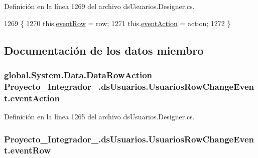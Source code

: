 Definición en la línea 1269 del archivo ds\-Usuarios.\-Designer.\-cs.


\begin{DoxyCode}
1269                                                                                                    \{
1270                 this.\hyperlink{class_proyecto___integrador__3_1_1ds_usuarios_1_1_usuarios_row_change_event_af50597f4b5fdc0ce6b23b6873296b94c}{eventRow} = row;
1271                 this.\hyperlink{class_proyecto___integrador__3_1_1ds_usuarios_1_1_usuarios_row_change_event_a426439315e86d5296a63052620758e78}{eventAction} = action;
1272             \}
\end{DoxyCode}


\subsection{Documentación de los datos miembro}
\hypertarget{class_proyecto___integrador__3_1_1ds_usuarios_1_1_usuarios_row_change_event_a426439315e86d5296a63052620758e78}{
\subsubsection[{event\-Action}]{\setlength{\rightskip}{0pt plus 5cm}global.\-System.\-Data.\-Data\-Row\-Action Proyecto\-\_\-\-Integrador\-\_.\-ds\-Usuarios.\-Usuarios\-Row\-Change\-Event.\-event\-Action\hspace{0.3cm}{\ttfamily [private]}}}\label{class_proyecto___integrador__3_1_1ds_usuarios_1_1_usuarios_row_change_event_a426439315e86d5296a63052620758e78}


Definición en la línea 1265 del archivo ds\-Usuarios.\-Designer.\-cs.

\hypertarget{class_proyecto___integrador__3_1_1ds_usuarios_1_1_usuarios_row_change_event_af50597f4b5fdc0ce6b23b6873296b94c}{
\subsubsection[{event\-Row}]{ Proyecto\-\_\-\-Integrador\-\_.\-ds\-Usuarios.\-Usuarios\-Row\-Change\-Event.\-event\-Row\hspace{0.3cm}{\ttfamily [private]}}}\label{class_proyecto___integrador__3_1_1ds_usuarios_1_1_usuarios_row_change_event_af50597f4b5fdc0ce6b23b6873296b94c}


